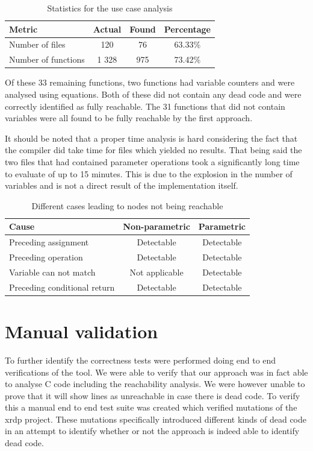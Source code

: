 \documentclass[12pt]{thesis}
\begin{document}
\begin{table}[h]
	\centering
	\begin{tabular}{ |p{4.5cm}|c|c|c|  }
		\hline
		Metric 				& Actual & Found & Percentage\\
		\hline
		Number of files 	& 120	 & 76 & 63.33\%\\
		\hline
		Number of functions & 1 328	 & 975 & 73.42\%\\
		\hline
	\end{tabular}
	\caption{Statistics for the use case analysis}
\end{table}

Of these 33 remaining functions, two functions had variable counters and were analysed using equations. Both of these did not contain any dead code and were correctly identified as fully reachable. The 31 functions that did not contain variables were all found to be fully reachable by the first approach.

It should be noted that a proper time analysis is hard considering the fact that the compiler did take time for files which yielded no results. That being said the two files that had contained parameter operations took a significantly long time to evaluate of up to 15 minutes. This is due to the explosion in the number of variables and is not a direct result of the implementation itself.

\begin{table}[b]
	\centering
	\begin{tabular}{ |p{4.2cm}|c|c|  }
		\hline
		Cause	 						& Non-parametric & Parametric\\
		\hline
		Preceding assignment			& Detectable	 & Detectable \\
		\hline
		Preceding operation				& Detectable	 & Detectable \\
		\hline
		Variable can not match		 	& Not applicable & Detectable \\
		\hline
		Preceding conditional return	& Detectable	 & Detectable \\
		\hline
	\end{tabular}
	\caption{Different cases leading to nodes not being reachable}
	\label{table:manual}
\end{table}

\chapter{Manual validation}
To further identify the correctness tests were performed doing end to end verifications of the tool. We were able to verify that our approach was in fact able to analyse C code including the reachability analysis. We were however unable to prove that it will show lines as unreachable in case there is dead code. To verify this a manual end to end test suite was created which verified mutations of the xrdp project. These mutations specifically introduced different kinds of dead code in an attempt to identify whether or not the approach is indeed able to identify dead code.
\end{document}
